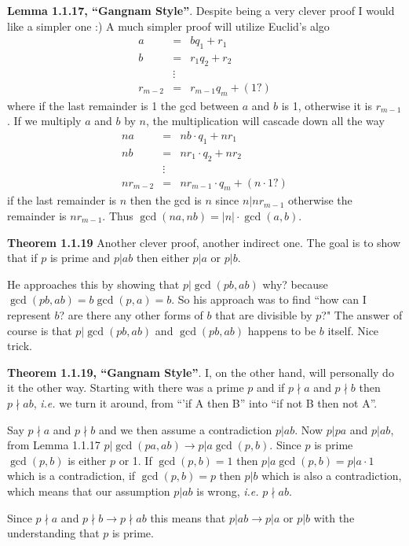 \documentclass[aps,preprint,preprintnumbers,nofootinbib,showpacs,prd]{revtex4-1}
\newcommand{\ie}{{\it i.e.} }
\newcommand{\nbea}{\begin{eqnarray*}}
\newcommand{\neea}{\end{eqnarray*}}
\begin{document}
{\bf Lemma 1.1.17, ``Gangnam Style''}. Despite being a very clever proof I would like a simpler one :) A much simpler proof will utilize Euclid's algo
%
\nbea
a & = & bq_1 + r_1 \\
b & = & r_1q_2 + r_2 \\
& \vdots & \\
r_{m-2} & = & r_{m-1} q_m + (1?)
\neea
%
where if the last remainder is 1 the gcd between $a$ and $b$ is 1, otherwise it is $r_{m-1}$. If we multiply $a$ and $b$ by $n$, the multiplication will cascade down all the way
%
\nbea
na & = & nb \cdot q_1 + nr_1 \\
nb & = & nr_1 \cdot q_2 + nr_2 \\
& \vdots & \\
nr_{m-2} & = & nr_{m-1} \cdot q_m + (n \cdot 1?)
\neea
%
if the last remainder is $n$ then the gcd is $n$ since $ n | nr_{m-1}$ otherwise the remainder is $nr_{m-1}$. Thus $\gcd(na,nb) = |n| \cdot \gcd(a,b)$.

{\bf Theorem 1.1.19} Another clever proof, another indirect one. The goal is to show that if $p$ is prime and $p|ab$ then either $p|a$ or $p|b$.

He approaches this by showing that $p|\gcd(pb, ab)$ why? because $\gcd(pb, ab) = b\gcd(p, a) = b$. So his approach was to find ``how can I represent $b$? are there any other forms of $b$ that are divisible by $p$?" The answer of course is that $p|\gcd(pb, ab)$ and $\gcd(pb, ab)$ happens to be $b$ itself. Nice trick.

{\bf Theorem 1.1.19, ``Gangnam Style''}. I, on the other hand, will personally do it the other way. Starting with there was a prime $p$ and if $p \nmid a$ and $p \nmid b$ then $p \nmid ab$, \ie we turn it around, from ``'if A then B'' into ``if not B then not A''.

Say $p \nmid a$ and $p \nmid b$ and we then assume a contradiction $p | ab$. Now $p | pa$ and $p | ab$, from Lemma 1.1.17 $p | \gcd(pa,ab) \to p | a \gcd (p,b)$. Since $p$ is prime $\gcd(p,b)$ is either $p$ or 1. If $\gcd(p,b) = 1$ then $p | a \gcd (p,b) = p|a \cdot 1$ which is a contradiction, if $\gcd(p,b) = p$ then $p|b$ which is also a contradiction, which means that our assumption $p|ab$ is wrong, \ie $p \nmid ab$.

Since $p \nmid a$ and $p \nmid b \longrightarrow p \nmid ab$ this means that $p|ab \longrightarrow p|a$ or $p|b$ with the understanding that $p$ is prime.
\end{document}
